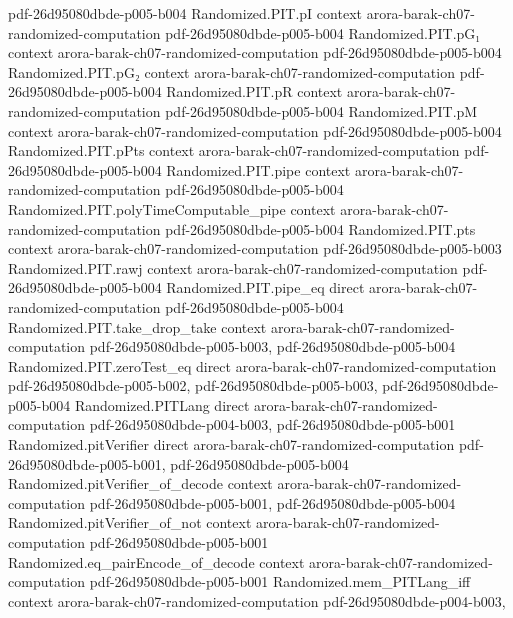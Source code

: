 \begin{theorem}
  {pdf-26d95080dbde-p005-b004}
\proofstep
  {Randomized.PIT.pI}
  {context}
  {arora-barak-ch07-randomized-computation}
  {pdf-26d95080dbde-p005-b004}
\proofstep
  {Randomized.PIT.pG₁}
  {context}
  {arora-barak-ch07-randomized-computation}
  {pdf-26d95080dbde-p005-b004}
\proofstep
  {Randomized.PIT.pG₂}
  {context}
  {arora-barak-ch07-randomized-computation}
  {pdf-26d95080dbde-p005-b004}
\proofstep
  {Randomized.PIT.pR}
  {context}
  {arora-barak-ch07-randomized-computation}
  {pdf-26d95080dbde-p005-b004}
\proofstep
  {Randomized.PIT.pM}
  {context}
  {arora-barak-ch07-randomized-computation}
  {pdf-26d95080dbde-p005-b004}
\proofstep
  {Randomized.PIT.pPts}
  {context}
  {arora-barak-ch07-randomized-computation}
  {pdf-26d95080dbde-p005-b004}
\proofstep
  {Randomized.PIT.pipe}
  {context}
  {arora-barak-ch07-randomized-computation}
  {pdf-26d95080dbde-p005-b004}
\proofstep
  {Randomized.PIT.polyTimeComputable_pipe}
  {context}
  {arora-barak-ch07-randomized-computation}
  {pdf-26d95080dbde-p005-b004}
\proofstep
  {Randomized.PIT.pts}
  {context}
  {arora-barak-ch07-randomized-computation}
  {pdf-26d95080dbde-p005-b003}
\proofstep
  {Randomized.PIT.rawj}
  {context}
  {arora-barak-ch07-randomized-computation}
  {pdf-26d95080dbde-p005-b004}
\proofstep
  {Randomized.PIT.pipe_eq}
  {direct}
  {arora-barak-ch07-randomized-computation}
  {pdf-26d95080dbde-p005-b004}
\proofstep
  {Randomized.PIT.take_drop_take}
  {context}
  {arora-barak-ch07-randomized-computation}
  {pdf-26d95080dbde-p005-b003,
    pdf-26d95080dbde-p005-b004}
\proofstep
  {Randomized.PIT.zeroTest_eq}
  {direct}
  {arora-barak-ch07-randomized-computation}
  {pdf-26d95080dbde-p005-b002,
    pdf-26d95080dbde-p005-b003,
    pdf-26d95080dbde-p005-b004}
\proofstep
  {Randomized.PITLang}
  {direct}
  {arora-barak-ch07-randomized-computation}
  {pdf-26d95080dbde-p004-b003,
    pdf-26d95080dbde-p005-b001}
\proofstep
  {Randomized.pitVerifier}
  {direct}
  {arora-barak-ch07-randomized-computation}
  {pdf-26d95080dbde-p005-b001,
    pdf-26d95080dbde-p005-b004}
\proofstep
  {Randomized.pitVerifier_of_decode}
  {context}
  {arora-barak-ch07-randomized-computation}
  {pdf-26d95080dbde-p005-b001,
    pdf-26d95080dbde-p005-b004}
\proofstep
  {Randomized.pitVerifier_of_not}
  {context}
  {arora-barak-ch07-randomized-computation}
  {pdf-26d95080dbde-p005-b001}
\proofstep
  {Randomized.eq_pairEncode_of_decode}
  {context}
  {arora-barak-ch07-randomized-computation}
  {pdf-26d95080dbde-p005-b001}
\proofstep
  {Randomized.mem_PITLang_iff}
  {context}
  {arora-barak-ch07-randomized-computation}
  {pdf-26d95080dbde-p004-b003,
}
\end{theorem}
